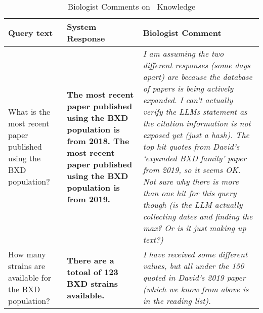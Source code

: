 \begin{comment}
    Knowledge
\end{comment}

\begin{table*}[h!]
  \footnotesize
  \centering
  \begin{tabular}{|p{}|p{}|p{}|}
    \hline
    {\Large \textbf{Query text}} & {\Large \textbf{System Response}} & {\Large \textbf{Biologist Comment}} \\
    \hline
    \hline
    What is the most recent paper published using the BXD population? & \textbf{The most recent paper published using the BXD population is from 2018. The most recent paper published using the BXD population is from 2019.} & \textit{I am assuming the two different responses (some days apart) are because the database of papers is being actively expanded. I can’t actually verify the LLMs statement as the citation information is not exposed yet (just a hash). The top hit quotes from David’s ‘expanded BXD family’ paper from 2019, so it seems OK. Not sure why there is more than one hit for this query though (is the LLM actually collecting dates and finding the max? Or is it just making up text?)} \\
    \hline
    How many strains are available for the BXD population? &\textbf{There are a totoal of 123 BXD strains available.} & \textit{I have received some different values, but all under the 150 quoted in David's 2019 paper (which we know from above is in the reading list).} \\
    \hline
  \end{tabular}
  \normalsize
  \caption{Biologist Comments on \project\ Knowledge}
  \label{tab:rupertsknowledge}
\end{table*}